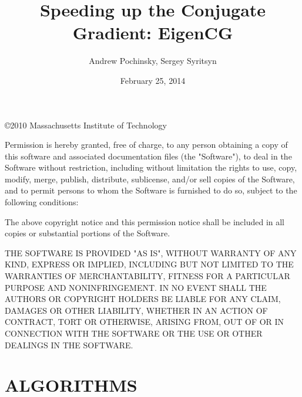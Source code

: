 \documentclass[oneside,openright]{report}
\title{Speeding up the Conjugate Gradient: EigenCG}
\author{Andrew Pochinsky, Sergey Syritsyn}
\date{February 25, 2014}
\begin{document}
\maketitle
\thispagestyle{empty}\hbox{}
\vfill
\copyright 2010 Massachusetts Institute of Technology

Permission is hereby granted, free of charge, to any person obtaining
a copy of this software and associated documentation files (the
"Software"), to deal in the Software without restriction, including
without limitation the rights to use, copy, modify, merge, publish,
distribute, sublicense, and/or sell copies of the Software, and to
permit persons to whom the Software is furnished to do so, subject to
the following conditions:

The above copyright notice and this permission notice shall be
included in all copies or substantial portions of the Software.

THE SOFTWARE IS PROVIDED "AS IS", WITHOUT WARRANTY OF ANY KIND,
EXPRESS OR IMPLIED, INCLUDING BUT NOT LIMITED TO THE WARRANTIES OF
MERCHANTABILITY, FITNESS FOR A PARTICULAR PURPOSE AND
NONINFRINGEMENT. IN NO EVENT SHALL THE AUTHORS OR COPYRIGHT HOLDERS BE
LIABLE FOR ANY CLAIM, DAMAGES OR OTHER LIABILITY, WHETHER IN AN ACTION
OF CONTRACT, TORT OR OTHERWISE, ARISING FROM, OUT OF OR IN CONNECTION
WITH THE SOFTWARE OR THE USE OR OTHER DEALINGS IN THE SOFTWARE.
\pagebreak

\tableofcontents

\listofalgorithms

\chapter{ALGORITHMS}
\end{document}
